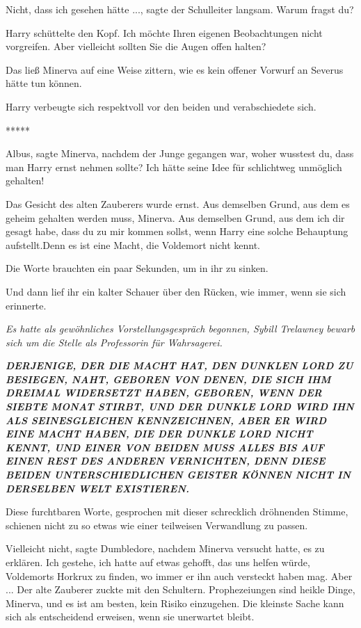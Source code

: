 \glqq{}Nicht, dass ich gesehen hätte ...\grqq{}, sagte der Schulleiter langsam.
\glqq{}Warum fragst du?\grqq{}

Harry schüttelte den Kopf. \glqq{}Ich möchte Ihren eigenen Beobachtungen nicht
vorgreifen. Aber vielleicht sollten Sie die Augen offen halten?\grqq{}

Das ließ Minerva auf eine Weise zittern, wie es kein offener Vorwurf an Severus
hätte tun können.

Harry verbeugte sich respektvoll vor den beiden und verabschiedete sich.

\begin{center}*****\end{center}

\glqq{}Albus\grqq{}, sagte Minerva, nachdem der Junge gegangen war, \glqq{}woher
wusstest du, dass man Harry ernst nehmen sollte? Ich hätte seine Idee für
schlichtweg unmöglich gehalten!\grqq{}

Das Gesicht des alten Zauberers wurde ernst. \glqq{}Aus demselben Grund, aus dem
es geheim gehalten werden muss, Minerva. Aus demselben Grund, aus dem ich dir
gesagt habe, dass du zu mir kommen sollst, wenn Harry eine solche Behauptung
aufstellt.Denn es ist eine Macht, die Voldemort nicht kennt.\grqq{}

Die Worte brauchten ein paar Sekunden, um in ihr zu sinken.

Und dann lief ihr ein kalter Schauer über den Rücken, wie immer, wenn sie sich
erinnerte.

\emph{Es hatte als gewöhnliches Vorstellungsgespräch begonnen, Sybill Trelawney
bewarb sich um die Stelle als Professorin für Wahrsagerei.}

\emph{}\textbf{\emph{DERJENIGE, DER DIE MACHT HAT, DEN DUNKLEN LORD ZU BESIEGEN,
NAHT, GEBOREN VON DENEN, DIE SICH IHM DREIMAL WIDERSETZT HABEN, GEBOREN, WENN
DER SIEBTE MONAT STIRBT, UND DER DUNKLE LORD WIRD IHN ALS SEINESGLEICHEN
KENNZEICHNEN, ABER ER WIRD EINE MACHT HABEN, DIE DER DUNKLE LORD NICHT KENNT,
UND EINER VON BEIDEN MUSS ALLES BIS AUF EINEN REST DES ANDEREN VERNICHTEN, DENN
DIESE BEIDEN UNTERSCHIEDLICHEN GEISTER KÖNNEN NICHT IN DERSELBEN WELT
EXISTIEREN.}}

Diese furchtbaren Worte, gesprochen mit dieser schrecklich dröhnenden Stimme,
schienen nicht zu so etwas wie einer teilweisen Verwandlung zu passen.

\glqq{}Vielleicht nicht\grqq{}, sagte Dumbledore, nachdem Minerva versucht
hatte, es zu erklären. \glqq{}Ich gestehe, ich hatte auf etwas gehofft, das uns
helfen würde, Voldemorts Horkrux zu finden, wo immer er ihn auch versteckt haben
mag. Aber ...\grqq{} Der alte Zauberer zuckte mit den Schultern.
\glqq{}Prophezeiungen sind heikle Dinge, Minerva, und es ist am besten, kein
Risiko einzugehen. Die kleinste Sache kann sich als entscheidend erweisen, wenn
sie unerwartet bleibt.\grqq{}

